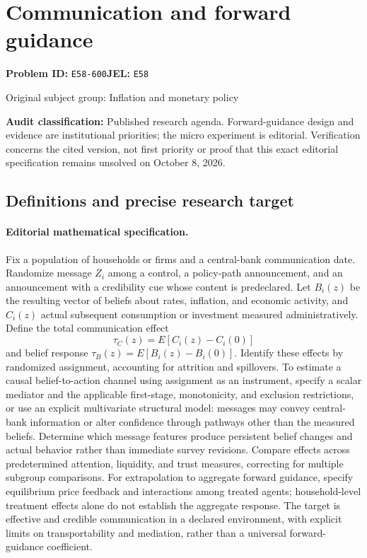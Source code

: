\documentclass[11pt,a4paper]{article}
\begin{document}
\section*{Communication and forward guidance}
\textbf{Problem ID:} \texttt{E58-600}\quad \textbf{JEL:} \texttt{E58}\par
\label{problem:OP-0250}
{\sffamily\small\color{muted}Original subject group: Inflation and monetary policy\par}
\label{definitions:problem:30007531}
\textbf{Audit classification:} Published research agenda. Forward-guidance design and evidence are institutional priorities; the micro experiment is editorial. Verification concerns the cited version, not first priority or proof that this exact editorial specification remains unsolved on October 8, 2026.
\subsection*{Definitions and precise research target}
\paragraph{Editorial mathematical specification.} Fix a population of households or firms and a central-bank communication date. Randomize message \(Z_i\) among a control, a policy-path announcement, and an announcement with a credibility cue whose content is predeclared. Let \(B_i(z)\) be the resulting vector of beliefs about rates, inflation, and economic activity, and \(C_i(z)\) actual subsequent consumption or investment measured administratively. Define the total communication effect
\[
\tau_C(z)=E[C_i(z)-C_i(0)]
\]
and belief response \(\tau_B(z)=E[B_i(z)-B_i(0)]\). Identify these effects by randomized assignment, accounting for attrition and spillovers. To estimate a causal belief-to-action channel using assignment as an instrument, specify a scalar mediator and the applicable first-stage, monotonicity, and exclusion restrictions, or use an explicit multivariate structural model: messages may convey central-bank information or alter confidence through pathways other than the measured beliefs.
Determine which message features produce persistent belief changes and actual behavior rather than immediate survey revisions. Compare effects across predetermined attention, liquidity, and trust measures, correcting for multiple subgroup comparisons. For extrapolation to aggregate forward guidance, specify equilibrium price feedback and interactions among treated agents; household-level treatment effects alone do not establish the aggregate response. The target is effective and credible communication in a declared environment, with explicit limits on transportability and mediation, rather than a universal forward-guidance coefficient.
\end{document}
